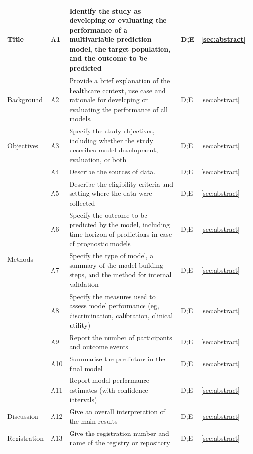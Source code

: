 \documentclass{article}
\begin{document}
\begin{longtable}{p{} l p{} l l}
         Title & A1 & Identify the study as developing or evaluating the performance of a multivariable prediction model, the target population, and the outcome to be predicted & D;E & \ref{sec:abstract} \\
         \midrule
         Background &  A2 & Provide a brief explanation of the healthcare context, use case and rationale for developing or evaluating the performance of all models. & D;E &  \ref{sec:abstract}\\
         \midrule
         Objectives &  A3 & Specify the study objectives, including whether the study describes model development, evaluation, or both & D;E & \ref{sec:abstract} \\
         \midrule
        \multirow{6}{4em}{Methods} & A4 & Describe the sources of data. & D;E & \ref{sec:abstract} \\
        & A5 & Describe the eligibility criteria and setting where the data were collected & D;E & \ref{sec:abstract} \\
        & A6 &  Specify the outcome to be predicted by the model, including time horizon of predictions in case of prognostic models & D;E & \ref{sec:abstract} \\
        & A7 & Specify the type of model, a summary of the model-building steps, and the method for internal validation & D;E & \ref{sec:abstract} \\
        & A8 & Specify the measures used to assess model performance (eg, discrimination, calibration, clinical utility) & D;E & \ref{sec:abstract} \\
        \midrule
        \multirow{3}{4em}{Results} &  A9 & Report the number of participants and outcome events & D;E & \ref{sec:abstract} \\
         &  A10 & Summarise the predictors in the final model & D;E & \ref{sec:abstract} \\
         &  A11 & Report model performance estimates (with confidence intervals) & D;E & \ref{sec:abstract} \\
         \midrule
        Discussion &  A12 & Give an overall interpretation of the main results & D;E & \ref{sec:abstract} \\
         \midrule
        Registration &  A13 & Give the registration number and name of the registry or repository & D;E &  \ref{sec:abstract}\\
         \bottomrule

     \end{longtable}

        
\end{document}
